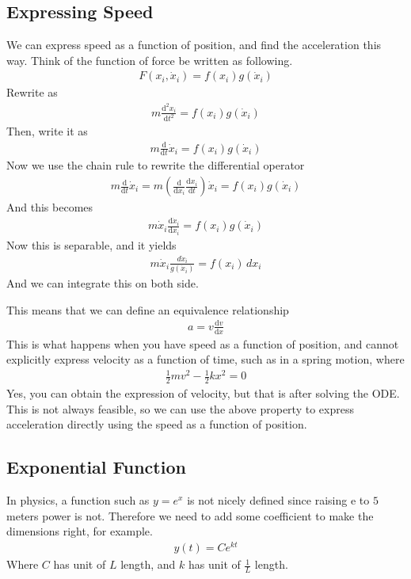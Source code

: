 \documentclass[12pt]{article}
\newcommand{\dydx}[2]{\frac{\text{d} #1}{\text{d} #2}}
\newcommand{\paren}[1]{\left( #1 \right)}
\begin{document}
\subsection{Expressing Speed}
We can express speed as a function of position, and find the acceleration this way. Think of the function of force be written as following. 
    \begin{align}
    F(x_i, \dot{x}_i) = f(x_i) g(\dot{x}_i)
    \end{align}
            Rewrite as
            \begin{align}
            m\dydx{^2x_i}{t^2} = f(x_i) g(\dot{x}_i)
            \end{align}
            Then, write it as
            \begin{align}
            m\dydx{}{t}\dot{x}_i = f(x_i) g(\dot{x}_i)
            \end{align}
            Now we use the chain rule to rewrite the differential operator
            \begin{align}
            m\dydx{}{t}\dot{x}_i  = m\paren{\dydx{}{x_i}\dydx{x_i}{t} }\dot{x}_i= f(x_i) g(\dot{x}_i)
            \end{align}
            And this becomes
            \begin{align}
            m\dot{x}_i\dydx{\dot{x}_i}{x_i} = f(x_i) g(\dot{x}_i)
            \end{align}
            Now this is separable, and it yields
            \begin{align}
            m\dot{x}_i\frac{d\dot{x}_i}{g(\dot{x}_i)} = f(x_i)\,dx_i
            \end{align}
            And we can integrate this on both side. 

    This means that we can define an equivalence relationship
    \begin{align}
    a = v\dydx{v}{x}
    \end{align}
    This is what happens when you have speed as a function of position, and cannot explicitly express velocity as a function of time, such as in a spring motion, where
    \begin{align}
    \frac{1}{2}mv^2 - \frac{1}{2}kx^2 = 0
    \end{align}
    Yes, you can obtain the expression of velocity, but that is after solving the ODE. This is not always feasible, so we can use the above property to express acceleration directly using the speed as a function of position. 

\subsection{Exponential Function}
    In physics, a function such as $y = e^{x}$ is not nicely defined since raising e to $5$ meters power is not. Therefore we need to add some coefficient to make the dimensions right, for example.
    \begin{align}
    y(t) = Ce^{kt}
    \end{align}
    Where $C$ has unit of $L$ length, and $k$ has unit of $\frac{1}{L}$ length.
\end{document}
